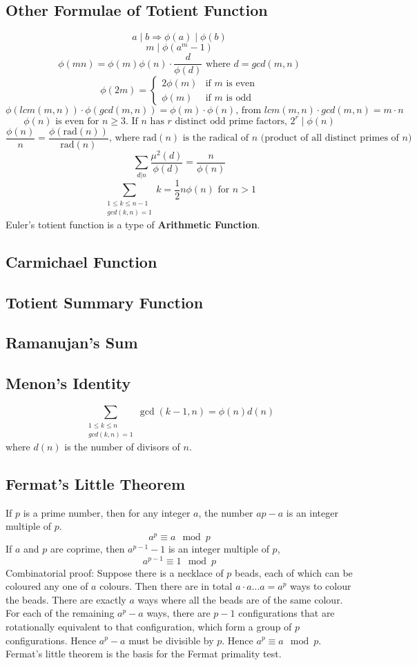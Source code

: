 \documentclass[12pt]{extarticle}
\begin{document}
\subsection*{Other Formulae of Totient Function}
$$a\;|\;b\Rightarrow \phi(a)\;|\;\phi(b)$$
$$m\;|\;\phi(a^{m}-1)$$
$$\phi(mn)=\phi(m)\phi(n)\cdot\frac{d}{\phi(d)}\text{ where }d=gcd(m,n)$$
$$\phi(2m)=\begin{cases}2\phi(m) &\text{if $m$ is even} \\ \phi(m)&\text{if $m$ is odd}\end{cases}$$
$$\phi(lcm(m,n))\cdot \phi(gcd(m,n))=\phi(m)\cdot\phi(n) \text{, from } lcm(m,n)\cdot gcd(m,n)=m\cdot n$$
$$\phi(n) \text{ is even for }n\geq 3. \text{ If $n$ has $r$ distinct odd prime factors, }2^{r}\;|\;\phi(n)$$
$$\frac{\phi(n)}{n}=\frac{\phi(\text{rad}(n))}{\text{rad}(n)}\text{, where rad$(n)$ is the radical of $n$ (product of all distinct primes of $n$)}$$
$$\sum_{d|n}\frac{\mu^{2}(d)}{\phi(d)}=\frac{n}{\phi(n)}$$
$$\sum_{\substack{1\leq k\leq n-1 \\ gcd(k,n)=1}}k=\frac{1}{2}n\phi(n) \text{ for }n > 1$$
Euler's totient function is a type of \textbf{Arithmetic Function}.
\subsection*{Carmichael Function}
\subsection*{Totient Summary Function}
\subsection*{Ramanujan's Sum}
\subsection*{Menon's Identity}
$$\sum_{\substack{1\leq k\leq n \\ gcd(k,n)=1}}\gcd(k-1,n)=\phi(n)d(n)$$
where $d(n)$ is the number of divisors of $n$.
\subsection*{Fermat's Little Theorem}
If $p$ is a prime number, then for any integer $a$, the number $ap - a$ is an integer multiple of $p$. 
$$a^{p}\equiv a \mod p$$
If $a$ and $p$ are coprime, then $a^{p-1}-1$ is an integer multiple of $p$, 
$$a^{p-1}\equiv 1 \mod p$$
Combinatorial proof: Suppose there is a necklace of $p$ beads, each of which can be coloured any one of $a$ colours. Then there are in total $a\cdot a\dots a=a^{p}$ ways to colour the beads. There are exactly $a$ ways where all the beads are of the same colour. For each of the remaining $a^{p}-a$ ways, there are $p-1$ configurations that are rotationally equivalent to that configuration, which form a group of $p$ configurations. Hence $a^{p}-a$ must be divisible by $p$. Hence $a^{p}\equiv a \mod p$. \\
Fermat's little theorem is the basis for the Fermat primality test.
\end{document}
